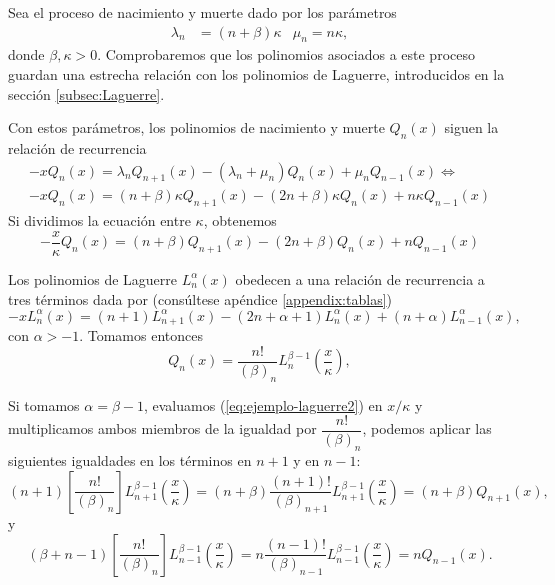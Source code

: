 \begin{ejemplo}
    Sea el proceso de nacimiento y muerte dado por los parámetros
    \begin{align*}
        \lambda_n &=(n+\beta)\kappa & \mu_n = n\kappa, 
    \end{align*}
    donde $\beta,\kappa > 0$. Comprobaremos que los polinomios asociados a este proceso guardan una estrecha relación con los polinomios de Laguerre, introducidos en la sección \ref{subsec:Laguerre}.

    Con estos parámetros, los polinomios de nacimiento y muerte $Q_n(x)$ siguen la relación de recurrencia
    \begin{equation*}
        \begin{array}{c}
            -xQ_n(x) = \lambda_n Q_{n+1}(x) - (\lambda_n+\mu_n)Q_n(x) +\mu_n Q_{n-1}(x) \Leftrightarrow \\
            -x Q_n(x) = (n+\beta)\kappa Q_{n+1}(x) -(2n+\beta)\kappa Q_n(x) + n\kappa Q_{n-1}(x)
        \end{array}
    \end{equation*}
    Si dividimos la ecuación entre $\kappa$, obtenemos
    \begin{equation}
        \label{eq:ejemplo-laguerre1}
        -\frac{x}{\kappa} Q_n(x) = (n+\beta)Q_{n+1}(x) -(2n+\beta)Q_n(x) + n Q_{n-1}(x)
    \end{equation}
    

    Los polinomios de Laguerre $L_n^\alpha(x)$ obedecen a una relación de recurrencia a tres términos dada por (consúltese apéndice \ref{appendix:tablas})
    \begin{equation}
        \label{eq:ejemplo-laguerre2}
        -x L_n^\alpha(x) = (n+1) L_{n+1}^\alpha(x) - (2n+\alpha+1)L_n^\alpha(x) + (n+\alpha)L_{n-1}^\alpha(x),
    \end{equation}
    con $\alpha > -1$. Tomamos entonces 
    \begin{equation}
        \label{eq:polinomiosQejemplo}
        Q_n(x) = \dfrac{n!}{(\beta)_n} L_n^{\beta-1}\left(\frac x \kappa\right),    
    \end{equation}
    
    Si tomamos $\alpha = \beta-1$, evaluamos (\ref{eq:ejemplo-laguerre2}) en $x/\kappa$ y multiplicamos ambos miembros de la igualdad por $\dfrac{n!}{(\beta)_n}$, podemos aplicar las siguientes igualdades en los términos en $n+1$ y en $n-1$:
    $$
    (n+1)\left[\dfrac{n!}{(\beta)_n}\right]L_{n+1}^{\beta-1} \left(\frac x \kappa\right) = (n+\beta)\dfrac{(n+1)!}{(\beta)_{n+1}} L_{n+1}^{\beta-1} \left(\frac x \kappa\right) = (n+\beta)Q_{n+1}(x),
    $$
    y
    $$
    (\beta+n-1)\left[\dfrac{n!}{(\beta)_n}\right]L_{n-1}^{\beta-1} \left(\frac x \kappa\right) = n\dfrac{(n-1)!}{(\beta)_{n-1}} L_{n-1}^{\beta-1} \left(\frac x \kappa\right) =n Q_{n-1}(x).
    $$
    

\end{ejemplo}
